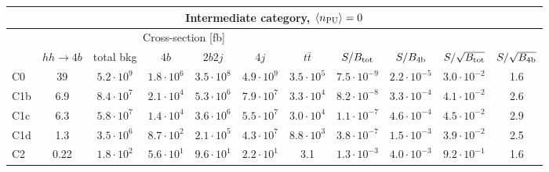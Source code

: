 \begin{tabular}{|l|cc|cccc|cccc|}
  \hline
\multicolumn{11}{|c|}{Intermediate category, $\left\langle n_{\rm PU}\right\rangle=0$}\\
\hline
&  \multicolumn{6}{c|}{Cross-section [fb]} &  &  & &  \\
   &  $hh\to 4b$ &  total bkg  &   $4b$    &  $2b2j$   &   $4j$    &
$t\bar{t}$ &
$S/B_{\rm tot}$ & $S/B_{\rm 4b}$ & $S/\sqrt{B_{\rm tot}}$ & $S/\sqrt{B_{\rm 4b}}$ \\
  \hline
  \hline
 C0      & 39  &   $5.2\cdot 10^9$   & $1.8\cdot 10^6$ & $3.5\cdot 10^8$ & $4.9\cdot 10^9$ & $3.5\cdot 10^5$ &  $7.5\cdot 10^{-9}$   & $2.2\cdot 10^{-5}$   &   $3.0\cdot 10^{-2}$   & 1.6  \\
 C1b     & 6.9  &   $8.4\cdot 10^7$   & $2.1\cdot 10^4$ & $5.3\cdot 10^6$ & $7.9\cdot 10^7$ & $3.3\cdot 10^4$ &  $8.2\cdot 10^{-8}$   & $3.3\cdot 10^{-4}$ &   $4.1\cdot 10^{-2}$   & 2.6 \\
 C1c     & 6.3  &   $5.8\cdot 10^7$   & $1.4\cdot 10^4$ & $3.6\cdot 10^6$ & $5.5\cdot 10^7$ & $3.0\cdot 10^4$ &  $1.1\cdot 10^{-7}$   & $4.6\cdot 10^{-4}$ &   $4.5\cdot 10^{-2}$   & 2.9\\
 C1d     & 1.3  &   $3.5\cdot 10^6$   & $8.7\cdot 10^2$ & $2.1\cdot 10^5$ & $4.3\cdot 10^7$ & $8.8\cdot 10^3$ &  $3.8\cdot 10^{-7}$   & $1.5\cdot 10^{-3}$  &   $3.9\cdot 10^{-2}$   & 2.5\\
 C2      & 0.22  &   $1.8\cdot 10^2$   & $5.6\cdot 10^1$ & $9.6\cdot 10^1$ & $2.2\cdot 10^1$ & 3.1 & $1.3\cdot 10^{-3}$   & $4.0\cdot 10^{-3}$  &   $9.2\cdot 10^{-1}$   & 1.6 \\
\hline
\end{tabular}
